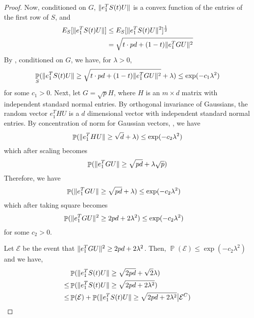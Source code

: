 \documentclass[11pt]{amsart}
\numberwithin{equation}{section}
\numberwithin{equation}{section}
\DeclareMathOperator{\Pb}{\mathbb{P}}
\DeclarePairedDelimiter{\norm}{\lVert}{\rVert}
\theoremstyle{remark}
\theoremstyle{definition}
\begin{document}
\begin{proof}
Now, conditioned on $G$, $\norm{e_{1}^TS(t)U}$ is a convex function of the entries of  the first row of $S$, and
\begin{align*}
    E_S[\norm{e_{1}^TS(t)U}] &\le  E_S[\norm{e_{1}^TS(t)U}^2]^\frac{1}{2} \\
    &= \sqrt{t\cdot pd + (1-t)\norm{e_{1}^TGU}^2}
\end{align*}
By \cite[Theorem 6.10]{boucheron2013concentration}, conditioned on $G$, we have, for $\lambda > 0$,
\begin{align*}
    \Pb_{S} ( \norm{e_{1}^TS(t)U} \ge \sqrt{t\cdot pd + (1-t)\norm{e_{1}^TGU}^2} + \lambda ) \le \exp(-c_1\lambda^2)
\end{align*}
for some $c_1>0$.
Next, let $G = \sqrt{p}H$, where $H$ is an $m \times d$ matrix with independent standard normal entries. By orthogonal invariance of Gaussians, the random vector $e_1^THU$ is a $d$ dimensional vector with independent standard normal entries. By concentration of norm for Gaussian vectors, \cite[Theorem 3.1.1]{vershyninhdp}, we have
\begin{align*}
    \Pb( \norm{e_1^THU} \ge \sqrt{d} + \lambda ) \le \exp(-c_2\lambda^2)
\end{align*}
which after scaling becomes
\begin{align*}
    \Pb( \norm{e_1^TGU} \ge \sqrt{pd} + \lambda\sqrt{p} )
\end{align*}
Therefore, we have
\begin{align*}
    \Pb( \norm{e_1^TGU} \ge \sqrt{pd} + \lambda ) &\le \exp(-c_2\lambda^2)
\end{align*}
which after taking square becomes
\begin{align*}
    \Pb( \norm{e_1^TGU}^2 \ge 2pd + 2\lambda^2 ) &\le \exp(-c_2\lambda^2)
\end{align*}
for some $c_2 > 0$.

Let $\mathcal{E}$ be the event that $\norm{e_1^TGU}^2 \ge 2pd + 2\lambda^2$. Then, $\Pb(\mathcal{E}) \le \exp(-c_2\lambda^2)$ and we have, 
\begin{align*}
    &\Pb ( \norm{e_{1}^TS(t)U} \ge \sqrt{2pd} + \sqrt{2}\lambda ) \\
    \le &\Pb ( \norm{e_{1}^TS(t)U} \ge \sqrt{2pd + 2\lambda^2} ) \\
    \le &\Pb(\mathcal{E}) + \Pb ( \norm{e_{1}^TS(t)U} \ge \sqrt{2pd + 2\lambda^2} \big\vert \mathcal{E}^C )
\end{align*}


\end{proof}
\end{document}
